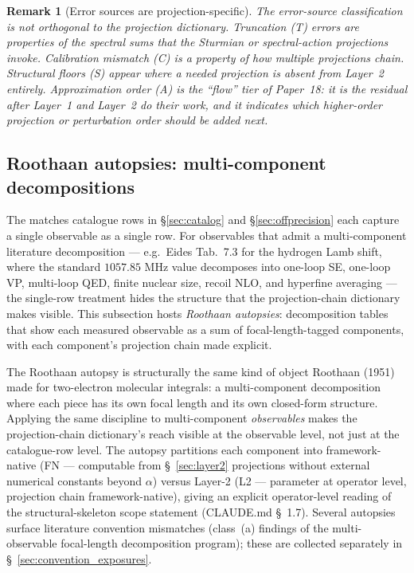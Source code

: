 \documentclass[11pt]{article}
\newtheorem{remark}{Remark}
\begin{document}
\begin{remark}[Error sources are projection-specific]
\label{rem:err_sources}
The error-source classification is not orthogonal to the projection
dictionary.  Truncation (T) errors are properties of the spectral
sums that the Sturmian or spectral-action projections invoke.
Calibration mismatch (C) is a property of how multiple projections
chain.  Structural floors (S) appear where a needed projection is
absent from Layer~2 entirely.  Approximation order (A) is the
``flow'' tier of Paper~18: it is the residual after Layer~1 and
Layer~2 do their work, and it indicates which higher-order projection
or perturbation order should be added next.
\end{remark}

\subsection{Roothaan autopsies: multi-component decompositions}
\label{sec:autopsies}

The matches catalogue rows in \S\ref{sec:catalog} and
\S\ref{sec:offprecision} each capture a single observable as a
single row.  For observables that admit a multi-component literature
decomposition --- e.g.\ Eides Tab.~7.3 for the hydrogen Lamb shift,
where the standard $1057.85$ MHz value decomposes into one-loop SE,
one-loop VP, multi-loop QED, finite nuclear size, recoil NLO, and
hyperfine averaging --- the single-row treatment hides the structure
that the projection-chain dictionary makes visible.  This subsection
hosts \emph{Roothaan autopsies}: decomposition tables that show each
measured observable as a sum of focal-length-tagged components, with
each component's projection chain made explicit.

The Roothaan autopsy is structurally the same kind of object Roothaan
(1951) made for two-electron molecular integrals: a multi-component
decomposition where each piece has its own focal length and its own
closed-form structure.  Applying the same discipline to multi-component
\emph{observables} makes the projection-chain dictionary's reach
visible at the observable level, not just at the catalogue-row level.
The autopsy partitions each component into framework-native (FN ---
computable from \S~\ref{sec:layer2} projections without external
numerical constants beyond $\alpha$) versus Layer-2 (L2 --- parameter
at operator level, projection chain framework-native), giving an
explicit operator-level reading of the structural-skeleton scope
statement (CLAUDE.md \S~1.7).  Several autopsies surface
literature convention mismatches (class~(a) findings of the
multi-observable focal-length decomposition program); these are
collected separately in \S~\ref{sec:convention_exposures}.
\end{document}
